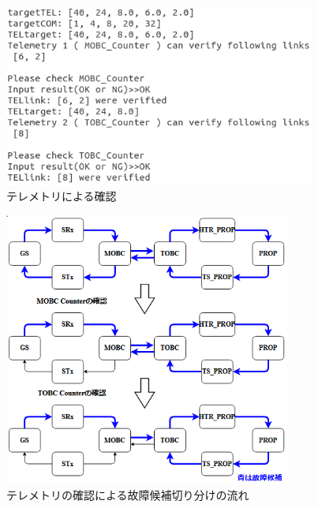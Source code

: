 \documentclass[11pt]{jsreport}
\begin{document}
\begin{figure}[H]
   \centering
      \includegraphics[height=6.0cm]{figure/COM14_TEL17_TEL_phase.png}
      \caption{テレメトリによる確認}
      \label{fig:tel_phase}
\end{figure}
\begin{figure}[H]
   \centering
      \includegraphics[height=9cm]{figure/TEL_process_HTR_PROP_fault.png}
      \caption{テレメトリの確認による故障候補切り分けの流れ}
      \label{fig:TEL_process}
\end{figure}
\end{document}

